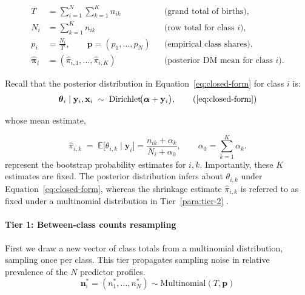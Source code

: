 \[
\begin{aligned}
T            &= \sum_{i=1}^{N}\sum_{k=1}^{K} n_{ik}              &&\text{(grand total of births)},\\[2pt]
N_i          &= \sum_{k=1}^{K} n_{ik}                            &&\text{(row total for class \(i\))},\\[2pt]
p_i          &= \frac{N_i}{T}, \qquad
\mathbf{p}   =(p_1,\dots,p_N)                                    &&\text{(empirical class shares)},\\[2pt]
\hat{\boldsymbol{\pi}}_i &= (\hat{\pi}_{i,1},\dots,\hat{\pi}_{i,K}) &&\text{(posterior DM mean for class \(i\))}.
\end{aligned}
\]

Recall that the posterior distribution in Equation~\ref{eq:closed-form} for class \(i\) is:
\[
    \boldsymbol{\theta}_i \mid \mathbf{y}_i, \mathbf{x}_i
    \;\sim\;    \operatorname{Dirichlet}\!\bigl(\boldsymbol{\alpha}+\mathbf{y}_i\bigr),
    \tag{\ref{eq:closed-form}}
\]

whose mean estimate,

\[
\hat{\pi}_{i,k}
\;=\;
\mathbb{E}\bigl[\theta_{i,k}\mid\mathbf{y}_i\bigr]
=
\frac{n_{ik}+\alpha_k}{N_i+\alpha_0},
\qquad
\alpha_0=\sum_{k=1}^{K}\alpha_k.
\]
represent the bootstrap probability estimates for \(i,k\). Importantly, these \(K\) estimates are fixed. The posterior distribution infers about \(\theta_{i,k}\) under Equation~\ref{eq:closed-form}, whereas the shrinkage estimate \(\hat{\pi}_{i,k}\) is referred to as fixed under a multinomial distribution in Tier~\ref{para:tier-2}  \parencite{wiki:shrinkage_statistic, duke}.

\paragraph{Tier 1: Between-class counts resampling}
\label{para:tier-1}
First we draw a new vector of class totals from a multinomial distribution, sampling once per class. This tier propagates sampling noise in relative prevalence of the \(N\) predictor profiles.
\begin{equation}
    \label{eq:stage1}
    \mathbf{n}_i^\ast = (n_1^\ast, \dots, n_N^\ast) \sim \mathrm{Multinomial}(T, \mathbf{p})
    \end{equation}
